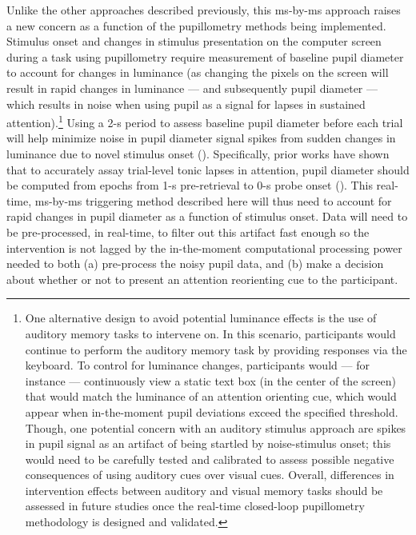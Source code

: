 Unlike the other approaches described previously, this ms-by-ms approach raises a new concern as a function of the pupillometry methods being implemented. Stimulus onset and changes in stimulus presentation on the computer screen during a task using pupillometry require measurement of baseline pupil diameter to account for changes in luminance (as changing the pixels on the screen will result in rapid changes in luminance --- and subsequently pupil diameter --- which results in noise when using pupil as a signal for lapses in sustained attention).\footnote{One alternative design to avoid potential luminance effects is the use of auditory memory tasks to intervene on. In this scenario, participants would continue to perform the auditory memory task by providing responses via the keyboard. To control for luminance changes, participants would --- for instance --- continuously view a static text box (in the center of the screen) that would match the luminance of an attention orienting cue, which would appear when in-the-moment pupil deviations exceed the specified threshold. Though, one potential concern with an auditory stimulus approach are spikes in pupil signal as an artifact of being startled by noise-stimulus onset; this would need to be carefully tested and calibrated to assess possible negative consequences of using auditory cues over visual cues. Overall, differences in intervention effects between auditory and visual memory tasks should be assessed in future studies once the real-time closed-loop pupillometry methodology is designed and validated.} Using a 2-s period to assess baseline pupil diameter before each trial will help minimize noise in pupil diameter signal spikes from sudden changes in luminance due to novel stimulus onset (\cite{unsworth2017importance}). Specifically, prior works have shown that to accurately assay trial-level tonic lapses in attention, pupil diameter should be computed from epochs from 1-s pre-retrieval to 0-s probe onset (\cite{madore2020memory, unsworth2016pupillary, unsworth2017importance, unsworth2018tracking}). This real-time, ms-by-ms triggering method described here will thus need to account for rapid changes in pupil diameter as a function of stimulus onset. Data will need to be pre-processed, in real-time, to filter out this artifact fast enough so the intervention is not lagged by the in-the-moment computational processing power needed to both (a) pre-process the noisy pupil data, and (b) make a decision about whether or not to present an attention reorienting cue to the participant.

